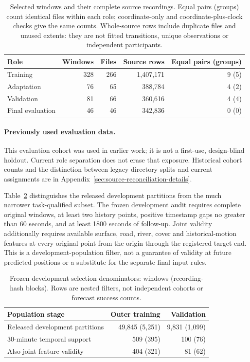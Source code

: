 \documentclass[11pt]{article}
\begin{document}
\begin{table}[htbp]
\centering\small
\caption{Selected windows and their complete source recordings. Equal pairs
(groups) count identical files within each role; coordinate-only and
coordinate-plus-clock checks give the same counts. Whole-source rows include
duplicate files and unused extents: they are not fitted transitions, unique
observations or independent participants.}
\label{tab:source-sequence-screen}
\begin{tabular}{@{}lrrrr@{}}
\toprule
Role & Windows & Files & Source rows & Equal pairs (groups)\\
\midrule
Training & 328 & 266 & 1,407,171 & 9 (5)\\
Adaptation & 76 & 65 & 388,784 & 4 (2)\\
Validation & 81 & 66 & 360,616 & 4 (4)\\
Final evaluation & 46 & 46 & 342,836 & 0 (0)\\
\bottomrule
\end{tabular}
\end{table}

\paragraph{Previously used evaluation data.}
This evaluation cohort was used in earlier work; it is not a first-use,
design-blind holdout. Current role separation does not erase that exposure.
Historical cohort counts and the distinction between legacy directory splits
and current assignments are in Appendix~\ref{sec:source-reconciliation-details}.

Table~\ref{tab:cohort-denominators} distinguishes the released development
partitions from the much narrower task-qualified subset. The frozen
development audit requires complete original windows, at least two history
points, positive timestamp gaps no greater than 60 seconds, and at least
1800 seconds of follow-up. Joint validity additionally requires available
surface, road, river, cover and historical-motion features at every original
point from the origin through the registered target end. This is a
development-population filter, not a guarantee of validity at future
predicted positions or a substitute for the separate final-input rules.

\begin{table}[htbp]
\centering\small
\caption{Frozen development selection denominators: windows (recording-hash blocks).
Rows are nested filters, not independent cohorts or forecast success counts.}
\label{tab:cohort-denominators}
\begin{tabular}{@{}p{.46\linewidth}rr@{}}
\toprule
Population stage & Outer training & Validation\\
\midrule
Released development partitions & 49,845 (5,251) & 9,831 (1,099)\\
30-minute temporal support & 509 (395) & 100 (76)\\
Also joint feature validity & 404 (321) & 81 (62)\\
\bottomrule
\end{tabular}
\end{table}
\end{document}
